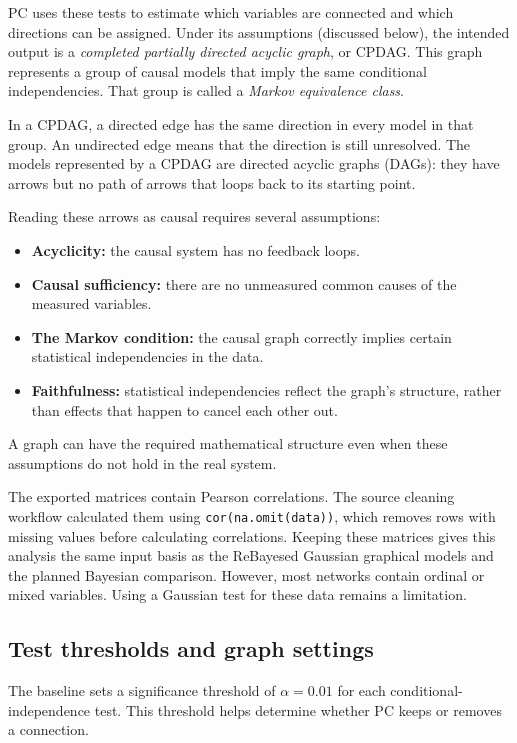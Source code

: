 \documentclass[11pt,a4paper]{article}
\begin{document}
PC uses these tests to estimate which variables are connected and which directions can be assigned. Under its assumptions (discussed below), the intended output is a \emph{completed partially directed acyclic graph}, or CPDAG. This graph represents a group of causal models that imply the same conditional independencies. That group is called a \emph{Markov equivalence class}.

In a CPDAG, a directed edge has the same direction in every model in that group. An undirected edge means that the direction is still unresolved. The models represented by a CPDAG are directed acyclic graphs (DAGs): they have arrows but no path of arrows that loops back to its starting point.

Reading these arrows as causal requires several assumptions:
\begin{itemize}
\item \textbf{Acyclicity:} the causal system has no feedback loops.
\item \textbf{Causal sufficiency:} there are no unmeasured common causes of the measured variables.
\item \textbf{The Markov condition:} the causal graph correctly implies certain statistical independencies in the data.
\item \textbf{Faithfulness:} statistical independencies reflect the graph's structure, rather than effects that happen to cancel each other out.
\end{itemize}

A graph can have the required mathematical structure even when these assumptions do not hold in the real system.

The exported matrices contain Pearson correlations. The source cleaning workflow calculated them using \texttt{cor(na.omit(data))}, which removes rows with missing values before calculating correlations. Keeping these matrices gives this analysis the same input basis as the ReBayesed Gaussian graphical models and the planned Bayesian comparison. However, most networks contain ordinal or mixed variables. Using a Gaussian test for these data remains a limitation.

\subsection{Test thresholds and graph settings}
The baseline sets a significance threshold of $\alpha=0.01$ for each conditional-independence test. This threshold helps determine whether PC keeps or removes a connection.
\end{document}
